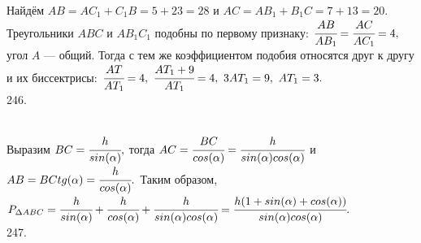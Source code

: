 \documentclass[12pt]{article}
\begin{document}
Найдём $AB=AC_1+C_1B=5+23=28$ и $AC=AB_1+B_1C=7+13=20.$ Треугольники $ABC$ и $AB_1C_1$ подобны по первому признаку: $\cfrac{AB}{AB_1}=\cfrac{AC}{AC_1}=4,$ угол $A$ --- общий. Тогда с тем же коэффициентом подобия относятся друг к другу и их биссектрисы: $\cfrac{AT}{AT_1}=4,\ \cfrac{AT_1+9}{AT_1}=4,\ 3AT_1=9,\ AT_1=3.$\\
246. \begin{figure}[ht!]
\end{figure}\\
Выразим $BC=\cfrac{h}{sin(\alpha)},$ тогда $AC=\cfrac{BC}{cos(\alpha)}=\cfrac{h}{sin(\alpha)cos(\alpha)}$ и $AB=BC tg(\alpha)=\cfrac{h}{cos(\alpha)}.$ Таким образом, $P_{\Delta ABC}=\cfrac{h}{sin(\alpha)}+\cfrac{h}{cos(\alpha)}+\cfrac{h}{sin(\alpha)cos(\alpha)}=
\cfrac{h(1+sin(\alpha)+cos(\alpha))}{sin(\alpha)cos(\alpha)}.$\\
247. \begin{figure}[ht!]
\end{figure}\\
\end{document}
